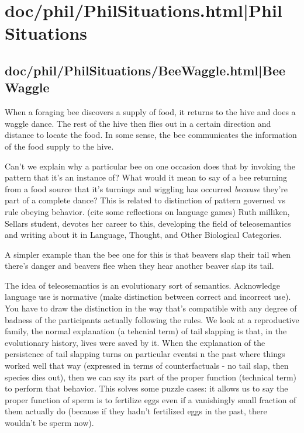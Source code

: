 \documentclass[12pt,a4paper]{report}
\begin{document}
\part{doc/phil/PhilSituations.html|Phil Situations}

\chapter{doc/phil/PhilSituations/BeeWaggle.html|Bee Waggle}
When a foraging bee discovers a supply of food, it returns to the hive and does
a waggle dance. The rest of the hive then flies out in a certain direction and
distance to locate the food. In some sense, the bee communicates the information
of the food supply to the hive.

Can't we explain why a particular bee on one
occasion does that by invoking the pattern that
it's an instance of? What would it mean to say of
a bee returning from a food source that it's
turnings and wiggling has occurred \emph{because}
they're part of a complete dance? This is related
to distinction of pattern governed vs rule
obeying behavior. (cite some reflections on
language games) Ruth milliken, Sellars student,
devotes her career to this, developing the field
of teleosemantics and writing about it in
Language, Thought, and Other Biological
Categories.

A simpler example than the bee one for this is
that beavers slap their tail when there's danger
and beavers flee when they hear another beaver
slap its tail.

The idea of teleosemantics is an evolutionary
sort of semantics. Acknowledge language use is
normative (make distinction between correct and
incorrect use). You have to draw the distinction
in the way that's compatible with any degree of
badness of the participants actually following
the rules. We look at a reproductive family, the
normal explanation (a tehcnial term) of tail
slapping is that, in the evolutionary history,
lives were saved by it. When the explanation of
the persistence of tail slapping turns on
particular eventsi n the past where things worked
well that way (expressed in terms of
counterfactuals - no tail slap, then species dies
out), then we can say its part of the proper
function (technical term) to perform that
behavior. This  solves some puzzle cases: it
allows us to say the proper function of sperm is
to fertilize eggs even if a vanishingly small
fraction of them actually do (because if they
hadn't fertilized eggs in the past, there
wouldn't be sperm now).
\end{document}
